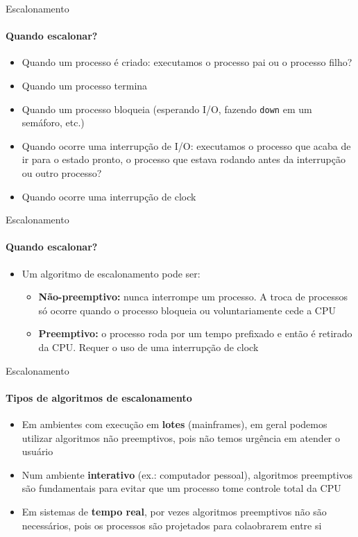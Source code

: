 \documentclass{beamer}
\begin{document}
\begin{frame}{Escalonamento}
	\framesubtitle{Quando escalonar?}
	\begin{itemize}
		\item Quando um processo é criado: executamos o processo pai ou o processo filho?
		\item Quando um processo termina
		\item Quando um processo bloqueia (esperando I/O, fazendo \texttt{down} em um semáforo, etc.)
		\item Quando ocorre uma interrupção de I/O: executamos o processo que acaba de ir para o estado pronto, o processo que estava rodando antes da interrupção ou outro processo?
		\item Quando ocorre uma interrupção de clock
	\end{itemize}
\end{frame}
\begin{frame}{Escalonamento}
	\framesubtitle{Quando escalonar?}
	\begin{itemize}
		\item Um algoritmo de escalonamento pode ser:
		\begin{itemize}
			\item \textbf{Não-preemptivo:} nunca interrompe um processo. A troca de processos só ocorre quando o processo bloqueia ou voluntariamente cede a CPU
			\item \textbf{Preemptivo:} o processo roda por um tempo prefixado e então é retirado da CPU. Requer o uso de uma interrupção de clock
		\end{itemize}
	\end{itemize}
\end{frame}
\begin{frame}{Escalonamento}
	\framesubtitle{Tipos de algoritmos de escalonamento}
	\begin{itemize}
		\item Em ambientes com execução em \textbf{lotes} (mainframes), em geral podemos utilizar algoritmos não preemptivos, pois não temos urgência em atender o usuário
		\item Num ambiente \textbf{interativo} (ex.: computador pessoal), algoritmos preemptivos são fundamentais para evitar que um processo tome controle total da CPU
		\item Em sistemas de \textbf{tempo real}, por vezes algoritmos preemptivos não são necessários, pois os processos são projetados para colaobrarem entre si
	\end{itemize}
\end{frame}
\end{document}
